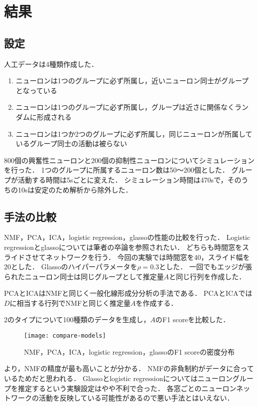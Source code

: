 \section{結果}
\subsection{設定}
人工データは4種類作成した．
\begin{enumerate}
  \item ニューロンは1つのグループに必ず所属し，近いニューロン同士がグループとなっている
  \item ニューロンは1つのグループに必ず所属し，グループは近さに関係なくランダムに形成される
  \item ニューロンは1つか2つのグループに必ず所属し，同じニューロンが所属しているグループ同士の活動は被らない
\end{enumerate}
800個の興奮性ニューロンと200個の抑制性ニューロンについてシミュレーションを行った．
1つのグループに所属するニューロン数は50〜200個とした．
グループが活動する時間は5sごとに変えた．
シミュレーション時間は470sで，そのうちの10sは安定のため解析から除外した．

\subsection{手法の比較}
NMF，PCA，ICA，logistic regression，glassoの性能の比較を行った．
Logistic regressionとglassoについては筆者の卒論を参照されたい．
どちらも時間窓をスライドさせてネットワークを行う．
今回の実験では時間窓を40，スライド幅を20とした．
Glassoのハイパーパラメータを$\rho = 0.3$とした．
一回でもエッジが張られたニューロン同士は同じグループとして推定量$A$と同じ行列を作成した．

PCAとICAはNMFと同じく一般化線形成分分析の手法\cite{Cichocki2009}である．
PCAとICAでは$D$に相当する行列でNMFと同じく推定量$A$を作成する．

2のタイプについて100種類のデータを生成し，$A$のF1 scoreを比較した．
\begin{figure}[htbp]
    \begin{center}
        \texttt{[image: compare-models]}
        \caption{NMF，PCA，ICA，logistic regression，glassoのF1 scoreの密度分布}
        \label{fig:compare-models}
    \end{center}
\end{figure}
より，NMFの精度が最も高いことが分かる．
NMFの非負制約がデータに合っているためだと思われる．
Glassoとlogistic regressionについてはニューロングループを推定するという実験設定はやや不利で合った．
各窓ごとのニューロンネットワークの活動を反映している可能性があるので悪い手法とはいえない．

